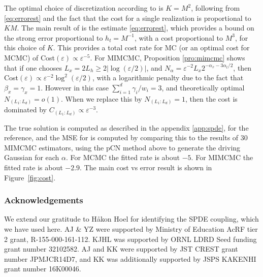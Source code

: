 \documentclass[english]{article}
\begin{document}
The optimal choice of discretization according to \cite{spde_disc} is $K = M^2$, 
following from \eqref{eq:errorest} and the fact that the cost for a single realization
is proportional to $KM$.  %
The main result of \cite{spde_disc} is the estimate \eqref{eq:errorest},
which %
provides a bound on the strong error proportional to $h_t=M^{-1}$, 
with a cost proportional to $M^{3}$,
for this choice of $K$.  
This provides a total cost rate for MC (or an optimal cost for MCMC) of
Cost$(\varepsilon) \propto \varepsilon^{-5}$.  
For MIMCMC, Proposition \ref{pro:mimcmc} shows that if one chooses
$L_x = 2 L_h \geq 2 |\log(\varepsilon/2)|$, 
and $N_\alpha=\varepsilon^{-2} L_x 2^{-\alpha_x-3 \alpha_t/2}$, 
then Cost$(\varepsilon) \propto \varepsilon^{-2} \log^2(\varepsilon/2)$, 
with a logarithmic penalty due to the fact that $\beta_x=\gamma_x=1$.
However in this case $\sum_{i=1}^d \gamma_i/w_i =3$,
and theoretically optimal $N_{(L_1:L_d)} =o(1)$.
When we replace this %
by $N_{(L_1:L_d)} =1$,
then the cost is dominated by $C_{(L_1:L_d)} \propto \varepsilon^{-3}$.



The true solution is computed as described in the appendix \ref{app:spde}, 
for the reference, and the MSE for is computed by comparing this to 
the results of 30 MIMCMC estimators, using the pCN method above to
 generate the driving Gaussian for each $\alpha$.
For MCMC the fitted rate is about $-5$.
For MIMCMC the fitted rate is about $-2.9$.
The main cost vs error result is shown in Figure~\ref{fig:cost}.  

















\subsubsection*{Acknowledgements} 
{ We extend our gratitude to H{\aa}kon Hoel for 
identifying the SPDE coupling, which we have used here. }
AJ \& YZ were supported by Ministry of Education AcRF tier 2 grant,
R-155-000-161-112. 
KJHL was supported by  
ORNL LDRD Seed funding grant number 32102582.
AJ and KK were supported by JST CREST grant number JPMJCR14D7, and KK was additionally supported by JSPS KAKENHI grant number 16K00046.
\end{document}
